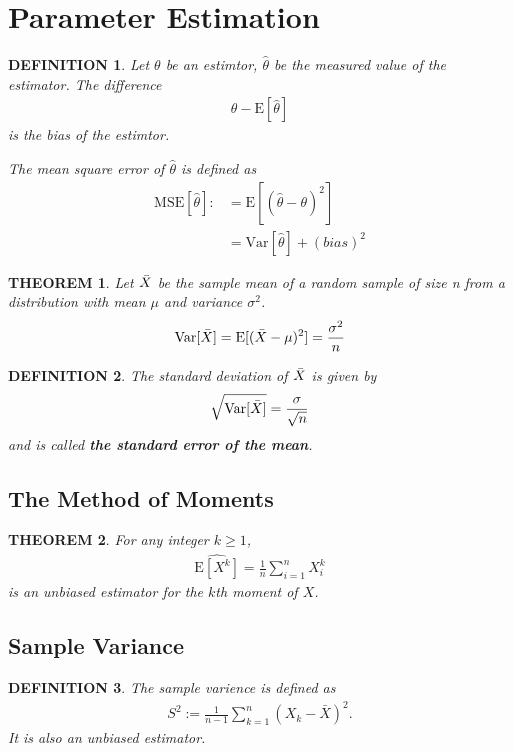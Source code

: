 \documentclass[11pt,a4paper]{article}
\newtheorem*{theorem}{\bf THEOREM}
\newtheorem*{definition}{\bf DEFINITION}
\begin{document}
\section{Parameter Estimation}
\begin{definition}
    Let $\theta$ be an estimtor, $\hat{\theta}$ be the measured value of the estimator.
    The difference
    \begin{gather*}
        \theta-\mathrm{E}[\hat{\theta}]
    \end{gather*}
    is the bias of the estimtor.

    The mean square error of $\hat{\theta}$ is defined as
    \begin{align*}
        \mathrm{MSE}[\hat{\theta}]: & =\mathrm{E}[(\hat{\theta}-\theta)^2] \\
                                    & =\mathrm{Var}[\hat{\theta}]+(bias)^2
    \end{align*}
\end{definition}
\begin{theorem}
    Let $\Bar{X}$ be the sample mean of a random sample of size n
    from a distribution with mean $\mu$ and variance $\sigma^2$.
    \begin{gather*}
        \mathrm{Var}[\Bar{X}]=\mathrm{E}[(\bar{X}-\mu)^2]=\frac{\sigma^2}{n}
    \end{gather*}
\end{theorem}
\begin{definition}
    The standard deviation of $\Bar{X}$ is given by
    \begin{gather*}
        \sqrt{\mathrm{Var}[\Bar{X}]}=\frac{\sigma}{\sqrt{n}}
    \end{gather*}
    and is called {\bf the standard error of the mean}.
\end{definition}

\subsection{The Method of Moments}
\begin{theorem}
    For any integer $k\ge1$,
    \begin{gather*}
        \widehat{\mathrm{E}[X^k]}=\frac{1}{n}\sum_{i=1}^{n}X_i^k
    \end{gather*}
    is an unbiased estimator for the $k$th moment of $X$.
\end{theorem}

\subsection{Sample Variance}
\begin{definition}
    The sample varience is defined as
    \begin{gather*}
        S^2:=\frac{1}{n-1}\sum_{k=1}^{n}\left(X_k-\bar{X}\right)^2.
    \end{gather*}
    It is also an unbiased estimator.
\end{definition}
\end{document}
